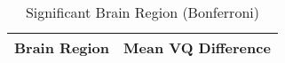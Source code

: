 \begin{table}
\caption{Significant Brain Region (Bonferroni)}
\label{tab:significant_VQ_bon}
\begin{tabular}{ll}
\toprule
Brain Region & Mean VQ Difference \\
\midrule
\bottomrule
\end{tabular}
\end{table}
